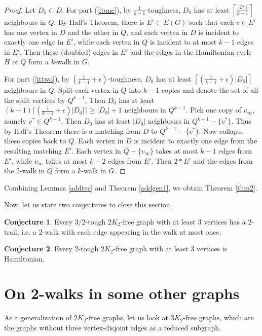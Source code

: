 \documentclass{amsart}
\theoremstyle{definition}
\newtheorem{conjecture}{Conjecture}
\begin{document}
\begin{proof}
Let $D_0\subset D$.
For part (\ref{itone}), 
by $\frac{1}{k-1}$-toughness, 
$D_0$ has at least $\left\lceil\frac{|D_0|}{k-1}\right\rceil$ neighbours in $Q$. By Hall's Theorem, 
there is $E'\subset E(G)$ such that each $e\in E'$ has one vertex in $D$ and the other in $Q$,
and each vertex in $D$ is incident to exactly one edge in $E'$, while each vertex in $Q$ is incident to at most $k-1$ edges in $E'$.
Then these ({doubled}) edges in $E'$ and the edges in the Hamiltonian cycle $H$ of $Q$ form a $k$-walk in $G$.

For part (\ref{ittwo}), by $\left(\frac{1}{k-1}+\epsilon\right)$-toughness, 
$D_0$ has at least $\left\lceil(\frac{1}{k-1}+\epsilon)|D_0|\right\rceil$ neighbours in $Q$. 
Split each vertex in $Q$ into $k-1$ copies and denote the set of all the split vertices by $Q^{k-1}$. 
Then $D_0$ has at least $(k-1)\lceil(\frac{1}{k-1}+\epsilon)|D_0|\rceil\ge|D_0|+1$ neighbours in $Q^{k-1}$. 
Pick one copy of $v_{\infty}$, namely $v^*\in Q^{k-1}$. Then $D_0$ has at least $|D_0|$ neighbours 
in $Q^{k-1}-\{v^*\}$. Thus by Hall's Theorem there is a matching from $D$ to $Q^{k-1}-\{v^*\}$. 
Now collapse these copies back to $Q$. Each vertex in $D$ is incident to exactly one edge from the resulting matching $E'$. 
Each vertex in $Q-\{v_{\infty}\}$ takes at most $k-1$ edges from $E'$,
while $v_{\infty}$ takes at most $k-2$ edges from $E'$. 
Then $2*E'$ and the edges from the 2-walk in $Q$ form a $k$-walk in $G$.
\end{proof}


Combining Lemmas \ref{addtec}  and Theorem \ref{addgen1},
we obtain Theorem \ref{thm2}.



\medskip

Now, let us state two conjectures to close this section.
\begin{conjecture}
Every $3/2$-tough $2K_2$-free graph with at least 3 vertices has a 2-trail, i.e. a 2-walk with each edge appearing in the walk at most once.
\end{conjecture}


\begin{conjecture}
Every 2-tough $2K_2$-free graph with at least 3 vertices is Hamiltonian.
\end{conjecture}

\section{On 2-walks in some other graphs}
As a generalization of $2K_2$-free graphs, let us look at $3K_2$-free graphs, which are the graphs without three vertex-disjoint edges as a reduced subgraph.
\end{document}
